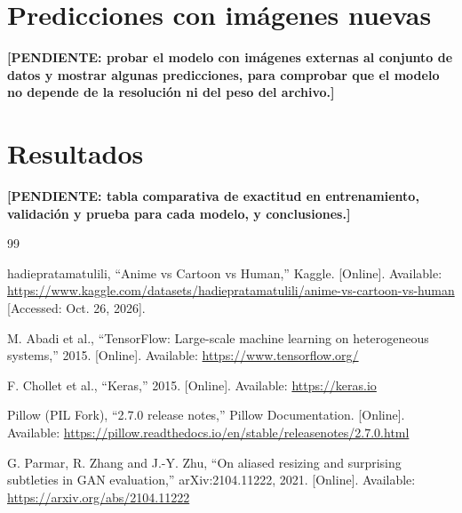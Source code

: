 \documentclass[letterpaper, 10 pt, conference]{ieeeconf}
\newcommand{\pendiente}[1]{\textbf{[PENDIENTE: #1]}}
\begin{document}

\section{Predicciones con imágenes nuevas}

\pendiente{probar el modelo con imágenes externas al conjunto de datos y mostrar algunas predicciones, para comprobar que el modelo no depende de la resolución ni del peso del archivo.}


\section{Resultados}

\pendiente{tabla comparativa de exactitud en entrenamiento, validación y prueba para cada modelo, y conclusiones.}


\begin{thebibliography}{99}

hadiepratamatulili, ``Anime vs Cartoon vs Human,'' Kaggle.
[Online]. Available:
\url{https://www.kaggle.com/datasets/hadiepratamatulili/anime-vs-cartoon-vs-human}
[Accessed: Oct. 26, 2026].

M. Abadi et al., ``TensorFlow: Large-scale machine learning on heterogeneous systems,'' 2015.
[Online]. Available: \url{https://www.tensorflow.org/}

F. Chollet et al., ``Keras,'' 2015.
[Online]. Available: \url{https://keras.io}

Pillow (PIL Fork), ``2.7.0 release notes,'' Pillow Documentation.
[Online]. Available: \url{https://pillow.readthedocs.io/en/stable/releasenotes/2.7.0.html}

G. Parmar, R. Zhang and J.-Y. Zhu, ``On aliased resizing and surprising subtleties in GAN evaluation,'' arXiv:2104.11222, 2021.
[Online]. Available: \url{https://arxiv.org/abs/2104.11222}

\end{thebibliography}
\end{document}
